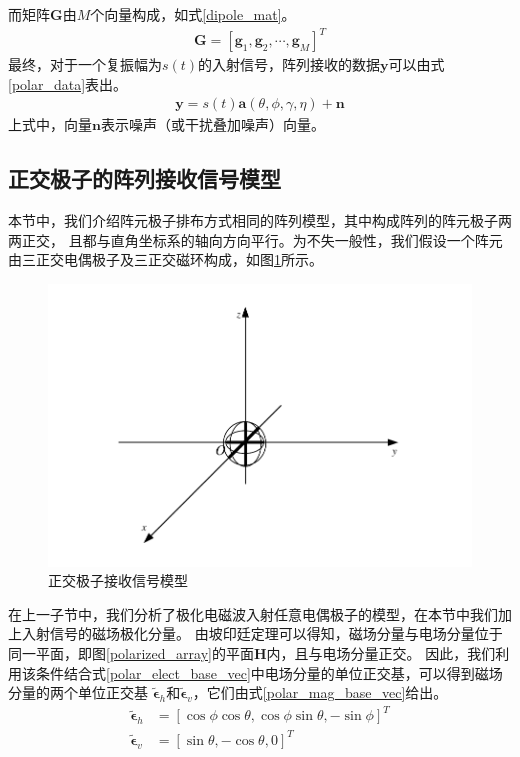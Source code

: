\documentclass[master]{thesis-uestc}
\begin{document}
而矩阵$\bm{G}$由$M$个向量构成，如式\eqref{dipole_mat}。
\begin{equation}\label{dipole_mat}
    \begin{aligned}
        \bm{G}=\left[\bm{g}_{1}, \bm{g}_{2}, \cdots, \bm{g}_{M}\right]^{T}
    \end{aligned}
\end{equation}
最终，对于一个复振幅为$s(t)$的入射信号，阵列接收的数据$\bm{y}$可以由式\eqref{polar_data}表出。
\begin{equation}\label{polar_data}
    \begin{aligned}
        \bm{y}=s(t) \bm{a}(\theta, \phi, \gamma, \eta)+\bm{n}
    \end{aligned}
\end{equation}
上式中，向量$\bm{n}$表示噪声（或干扰叠加噪声）向量。

\subsection{正交极子的阵列接收信号模型}
本节中，我们介绍阵元极子排布方式相同的阵列模型，其中构成阵列的阵元极子两两正交，
且都与直角坐标系的轴向方向平行。为不失一般性，我们假设一个阵元由三正交电偶极子及三正交磁环构成，如图\ref{ortho_dipole_model}所示。
\begin{figure}[h]
    \includegraphics[scale=0.8]{pic/ortho-dipole.pdf}
    \caption{正交极子接收信号模型}
    \label{ortho_dipole_model}
\end{figure}
在上一子节中，我们分析了极化电磁波入射任意电偶极子的模型，在本节中我们加上入射信号的磁场极化分量。
由坡印廷定理可以得知，磁场分量与电场分量位于同一平面，即图\ref{polarized_array}的平面$\bm{H}$内，且与电场分量正交。
因此，我们利用该条件结合式\eqref{polar_elect_base_vec}中电场分量的单位正交基，可以得到磁场分量的两个单位正交基
$\tilde{\bm{\epsilon}}_h$和$\tilde{\bm{\epsilon}}_v$，它们由式\eqref{polar_mag_base_vec}给出。
\begin{subequations}\label{polar_mag_base_vec}
    \begin{align}
        \tilde{\bm{\epsilon}}_h &= 
        \left[\cos\phi\cos\theta,\cos\phi\sin\theta,-\sin\phi\right]^T \\
        \tilde{\bm{\epsilon}}_v &= 
        \left[\sin\theta,-\cos\theta,0\right]^T
    \end{align}
\end{subequations}
\end{document}
